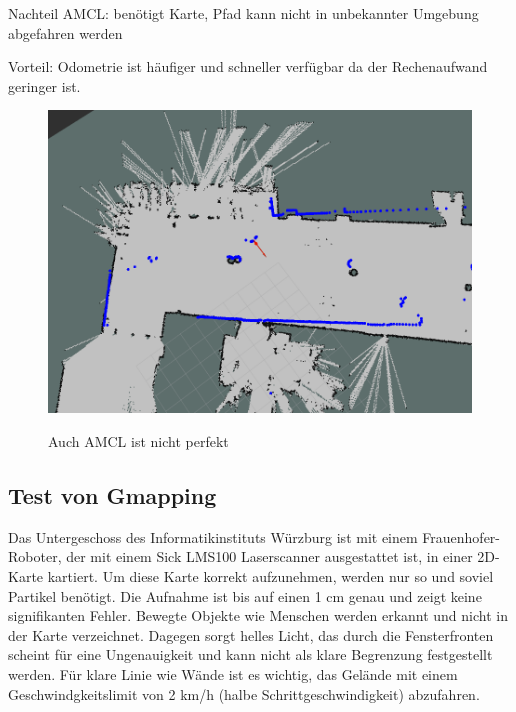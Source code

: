 \documentclass[11pt,a4paper]{article}
\begin{document}
{Nachteil AMCL: benötigt Karte, Pfad kann nicht in unbekannter Umgebung abgefahren werden

Vorteil: Odometrie ist h\"aufiger und schneller verf\"ugbar da der Rechenaufwand geringer ist. 

\begin{figure}[h]
	\centering
	{\includegraphics[width=\linewidth]{pictures/amcl_fail.png}}
	\caption{ Auch AMCL ist nicht perfekt }
\end{figure}




\subsection{Test von Gmapping}
{
	Das Untergeschoss des Informatikinstituts W\"urzburg ist mit einem Frauenhofer-Roboter, der mit einem Sick LMS100 Laserscanner ausgestattet ist, in einer 2D-Karte kartiert.  Um diese Karte korrekt aufzunehmen, werden nur so und soviel Partikel ben\"otigt. Die Aufnahme ist bis auf einen 1 cm genau und zeigt keine signifikanten Fehler. Bewegte Objekte wie Menschen werden erkannt und nicht in der Karte verzeichnet. Dagegen sorgt helles Licht, das durch die Fensterfronten scheint f\"ur eine Ungenauigkeit und kann nicht als klare Begrenzung festgestellt werden. F\"ur klare Linie wie W\"ande ist es wichtig, das Gel\"ande mit einem Geschwindgkeitslimit von 2 km/h (halbe Schrittgeschwindigkeit) abzufahren. 
	
}}
\end{document}
